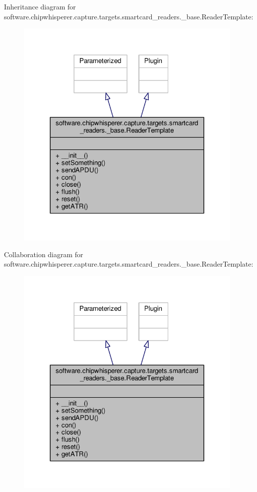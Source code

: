 Inheritance diagram for software.\+chipwhisperer.\+capture.\+targets.\+smartcard\+\_\+readers.\+\_\+base.\+Reader\+Template\+:\nopagebreak
\begin{figure}[H]
\begin{center}
\leavevmode
\includegraphics[width=312pt]{db/d83/classsoftware_1_1chipwhisperer_1_1capture_1_1targets_1_1smartcard__readers_1_1__base_1_1ReaderTemplate__inherit__graph}
\end{center}
\end{figure}


Collaboration diagram for software.\+chipwhisperer.\+capture.\+targets.\+smartcard\+\_\+readers.\+\_\+base.\+Reader\+Template\+:\nopagebreak
\begin{figure}[H]
\begin{center}
\leavevmode
\includegraphics[width=312pt]{d9/d78/classsoftware_1_1chipwhisperer_1_1capture_1_1targets_1_1smartcard__readers_1_1__base_1_1ReaderTemplate__coll__graph}
\end{center}
\end{figure}


